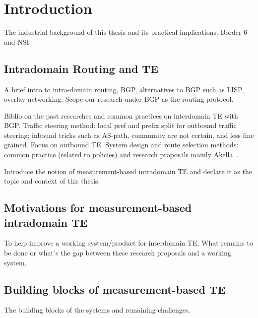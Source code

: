 \chapter{Introduction}
\label{sec:intro}

The industrial background of this thesis and its practical implications.
Border 6 and NSI.

\section{Intradomain Routing and TE}
A brief intro to intra-domain routing, BGP, alternatives to BGP such as LISP, overlay networking.
Scope our research under BGP as the routing protocol.

Biblio on the past researches and common practices on interdomain TE with BGP.
Traffic steering method: local pref and prefix split for outbound traffic steering; inbound tricks such as AS-path, community are not certain, and less fine grained. Focus on outbound TE.
System design and route selection methods: common practice (related to policies) and research proposals mainly Akella~\cite{Akella2008}.

Introduce the notion of measurement-based intradomain TE and declare it as the topic and context of this thesis.

\section{Motivations for measurement-based intradomain TE}
To help improve a working system/product for interdomain TE.
What remains to be done or what's the gap between these research proposals and a working system.

\section{Building blocks of measurement-based TE}
The building blocks of the systems and remaining challenges.

